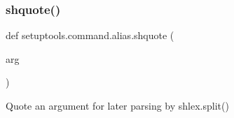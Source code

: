 \mbox{\label{namespacesetuptools_1_1command_1_1alias_ab7dcb5208d78b13962adc7fe0c257e10}} 
\subsubsection{\texorpdfstring{shquote()}{shquote()}}
{\footnotesize\ttfamily def setuptools.\+command.\+alias.\+shquote (\begin{DoxyParamCaption}\item[{}]{arg }\end{DoxyParamCaption})}

\begin{DoxyVerb}Quote an argument for later parsing by shlex.split()\end{DoxyVerb}
 